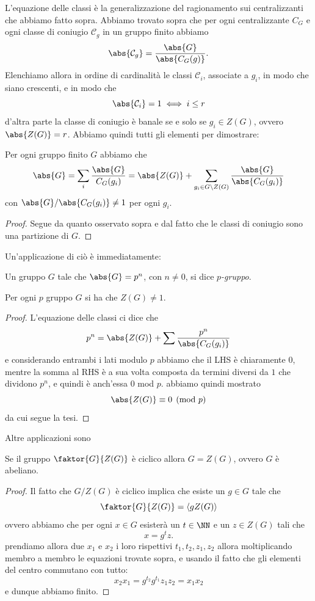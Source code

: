 \documentclass[11pt]{scrartcl}
\begin{document}
	 L'equazione delle classi è la generalizzazione del ragionamento sui centralizzanti che abbiamo fatto sopra. Abbiamo trovato sopra che per ogni centralizzante $C_G$ e ogni classe di coniugio $\mathcal{C}_{g}$ in un gruppo finito abbiamo
	 $$\abs{\mathcal{C}_g}=\frac{\abs{G}}{\abs{C_G(g)}}.$$
	 Elenchiamo allora in ordine di cardinalità le classi $\mathcal{C}_i$, associate a $g_i$, in modo che siano crescenti, e in modo che 
	 $$\abs{\mathcal{C}_i}=1 \iff i\le r$$
	 d'altra parte la classe di coniugio è banale se e solo se $g_i\in Z(G)$, ovvero $\abs{Z(G)}=r$. Abbiamo quindi tutti gli elementi per dimostrare:
	 \begin{proposition}
	 	Per ogni gruppo finito $G$ abbiamo che
	 	$$\abs{G}=\sum_{i}\frac{\abs{G}}{C_G(g_i)}=\abs{Z(G)}+\sum_{g_i\in G\setminus Z(G)}\frac{\abs{G}}{\abs{C_G(g_i)}}$$
	 	con $\abs{G}/\abs{C_G(g_i)}\ne 1$ per ogni $g_i$.
	 \end{proposition}
	 \begin{proof}
	 	Segue da quanto osservato sopra e dal fatto che le classi di coniugio sono una partizione di $G$.
	 \end{proof}
	 Un'applicazione di ciò è immediatamente:
	 \begin{definition}[$p$-gruppo]
	 	Un gruppo $G$ tale che $\abs{G}=p^n$, con $n\ne 0$, si dice \textit{$p$-gruppo}.
	 \end{definition}
	 \begin{proposition}
	 	Per ogni $p$ gruppo $G$ si ha che $Z(G)\ne 1$.
	 \end{proposition}
	 \begin{proof}
	 	L'equazione delle classi ci dice che
	 	$$p^n=\abs{Z(G)}+\sum \frac{p^n}{\abs{C_G(g_i)}}$$
	 	e considerando entrambi i lati modulo $p$ abbiamo che il LHS è chiaramente $0$, mentre la somma al RHS è a sua volta composta da termini diversi da $1$ che dividono $p^n$, e quindi è anch'essa $0$ mod $p$. abbiamo quindi mostrato
	 	$$\abs{Z(G)}\equiv 0 \pmod{p}$$
	 	da cui segue la tesi.
	 \end{proof}
	 Altre applicazioni sono
	 \begin{lemma}
	 	Se il gruppo $\faktor{G}{Z(G)}$ è ciclico allora $G=Z(G)$, ovvero $G$ è abeliano.
	 \end{lemma}
	 \begin{proof}
	 	Il fatto che $G/Z(G)$ è ciclico implica che esiste un $g\in G$ tale che
	 	$$\faktor{G}{Z(G)}=\langle gZ(G)\rangle$$
	 	ovvero abbiamo che per ogni $x\in G$ esisterà un $t\in \NN$ e un $z\in Z(G)$ tali che
	 	$$x=g^tz.$$
	 	prendiamo allora due $x_1$ e $x_2$ i loro rispettivi $t_1,t_2,z_1,z_2$ allora moltiplicando membro a membro le equazioni trovate sopra, e usando il fatto che gli elementi del centro commutano con tutto:
	 	$$x_2x_1=g^{t_2}g^{t_1}z_1z_2=x_1x_2$$
	 	e dunque abbiamo finito.
	 \end{proof}
\end{document}
